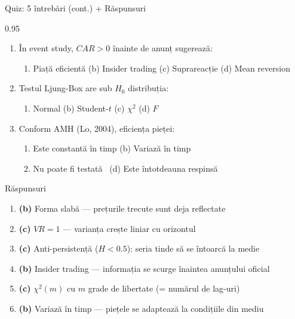 \documentclass[9pt, aspectratio=169, t]{beamer}
\begin{document}
\begin{frame}{Quiz: 5 întrebări (cont.) + Răspunsuri}
    \begin{cminipage}{0.95\textwidth}
\small
\begin{enumerate}\setlength{\itemsep}{0pt}
    \setcounter{enumi}{3}
    \item În event study, $CAR > 0$ înainte de anunț sugerează:
    \begin{enumerate}\setlength{\itemsep}{0pt}
        \item[(a)] Piață eficientă \quad (b) Insider trading \quad (c) Suprareacție \quad (d) Mean reversion
    \end{enumerate}

    \vspace{0.1cm}
    \item Testul Ljung-Box are sub $H_0$ distribuția:
    \begin{enumerate}\setlength{\itemsep}{0pt}
        \item[(a)] Normal \quad (b) Student-$t$ \quad (c) $\chi^2$ \quad (d) $F$
    \end{enumerate}

    \vspace{0.1cm}
    \item Conform AMH (Lo, 2004), eficiența pieței:
    \begin{enumerate}\setlength{\itemsep}{0pt}
        \item[(a)] Este constantă în timp \quad (b) Variază în timp
        \item[(c)] Nu poate fi testată \quad\;\, (d) Este întotdeauna respinsă
    \end{enumerate}
\end{enumerate}

\vspace{0.1cm}
\begin{exampleblock}{Răspunsuri}
\small
\begin{enumerate}\setlength{\itemsep}{0pt}
    \item \textbf{(b)} Forma slabă --- prețurile trecute sunt deja reflectate
    \item \textbf{(c)} $VR = 1$ --- varianța crește liniar cu orizontul
    \item \textbf{(c)} Anti-persistență ($H < 0.5$): seria tinde să se întoarcă la medie
    \item \textbf{(b)} Insider trading --- informația se scurge înaintea anunțului oficial
    \item \textbf{(c)} $\chi^2(m)$ cu $m$ grade de libertate (= numărul de lag-uri)
    \item \textbf{(b)} Variază în timp --- piețele se adaptează la condițiile din mediu
\end{enumerate}
\end{exampleblock}
    \end{cminipage}
\end{frame}
\end{document}
